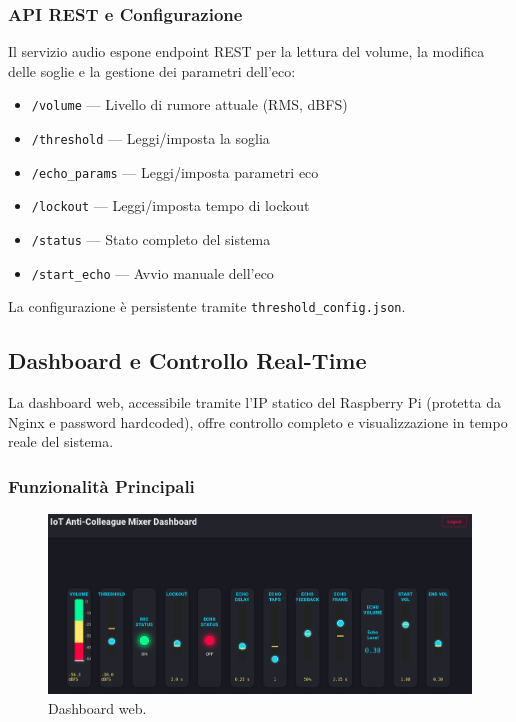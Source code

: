 \documentclass[fleqn,10pt]{SelfArx} %
\begin{document}
\subsubsection{API REST e Configurazione}

Il servizio audio espone endpoint REST per la lettura del volume, la modifica delle soglie e la gestione dei parametri dell’eco:

\begin{itemize}
	\item \texttt{/volume} — Livello di rumore attuale (RMS, dBFS)
	\item \texttt{/threshold} — Leggi/imposta la soglia
	\item \texttt{/echo\_params} — Leggi/imposta parametri eco
	\item \texttt{/lockout} — Leggi/imposta tempo di lockout
	\item \texttt{/status} — Stato completo del sistema
	\item \texttt{/start\_echo} — Avvio manuale dell’eco
\end{itemize}

La configurazione è persistente tramite \texttt{threshold\_config.json}.


\subsection{Dashboard e Controllo Real-Time}
\label{sec:dashboard}

La dashboard web, accessibile tramite l’IP statico del Raspberry Pi (protetta da Nginx e password hardcoded), offre controllo completo e visualizzazione in tempo reale del sistema.

\subsubsection{Funzionalità Principali}

\begin{figure}[ht]
	\centering
	\includegraphics[width=0.9\linewidth]{mixer.png}
	\caption{Dashboard web.}
	\label{fig:dashboard}
\end{figure}
\end{document}
